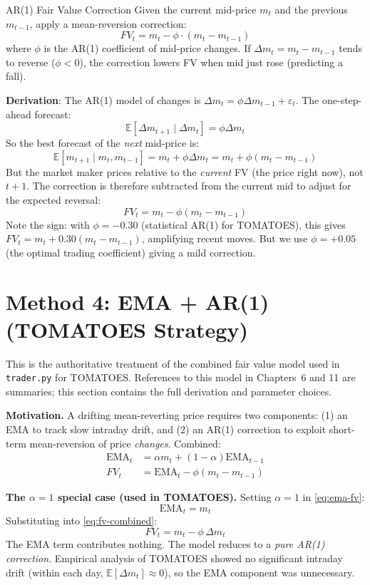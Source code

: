 \documentclass[12pt,a4paper,openany]{report}
\theoremstyle{definition}
\newcommand{\E}{\mathbb{E}}
\begin{document}
\begin{definitionbox}{AR(1) Fair Value Correction}
Given the current mid-price $m_t$ and the previous $m_{t-1}$, apply a mean-reversion correction:
\[
  FV_t = m_t - \phi \cdot (m_t - m_{t-1})
\]
where $\phi$ is the AR(1) coefficient of mid-price changes. If $\Delta m_t = m_t - m_{t-1}$ tends to reverse ($\phi < 0$), the correction lowers FV when mid just rose (predicting a fall).
\end{definitionbox}

\textbf{Derivation}: The AR(1) model of changes is $\Delta m_t = \phi \Delta m_{t-1} + \varepsilon_t$. The one-step-ahead forecast:
\[
  \E[\Delta m_{t+1} \mid \Delta m_t] = \phi \Delta m_t
\]
So the best forecast of the \emph{next} mid-price is:
\[
  \E[m_{t+1} \mid m_t, m_{t-1}] = m_t + \phi \Delta m_t = m_t + \phi(m_t - m_{t-1})
\]
But the market maker prices relative to the \emph{current} FV (the price right now), not $t+1$. The correction is therefore subtracted from the current mid to adjust for the expected reversal:
\[
  FV_t = m_t - \phi(m_t - m_{t-1})
\]
Note the sign: with $\phi = -0.30$ (statistical AR(1) for TOMATOES), this gives $FV_t = m_t + 0.30(m_t - m_{t-1})$, amplifying recent moves. But we use $\phi = +0.05$ (the optimal trading coefficient) giving a mild correction.

\section{Method 4: EMA + AR(1) (TOMATOES Strategy)}
\label{sec:ema-ar1}

This is the authoritative treatment of the combined fair value model used in \texttt{trader.py} for TOMATOES. References to this model in Chapters~6 and 11 are summaries; this section contains the full derivation and parameter choices.

\textbf{Motivation.} A drifting mean-reverting price requires two components: (1) an EMA to track slow intraday drift, and (2) an AR(1) correction to exploit short-term mean-reversion of price \emph{changes}. Combined:
\begin{align}
  \text{EMA}_t &= \alpha m_t + (1-\alpha)\text{EMA}_{t-1} \label{eq:ema-fv} \\
  FV_t &= \text{EMA}_t - \phi(m_t - m_{t-1}) \label{eq:fv-combined}
\end{align}

\textbf{The $\alpha = 1$ special case (used in TOMATOES).} Setting $\alpha = 1$ in \eqref{eq:ema-fv}:
\[
  \text{EMA}_t = m_t
\]
Substituting into \eqref{eq:fv-combined}:
\[
  FV_t = m_t - \phi\,\Delta m_t
\]
The EMA term contributes nothing. The model reduces to a \emph{pure AR(1) correction}. Empirical analysis of TOMATOES showed no significant intraday drift (within each day, $\E[\Delta m_t] \approx 0$), so the EMA component was unnecessary.
\end{document}
